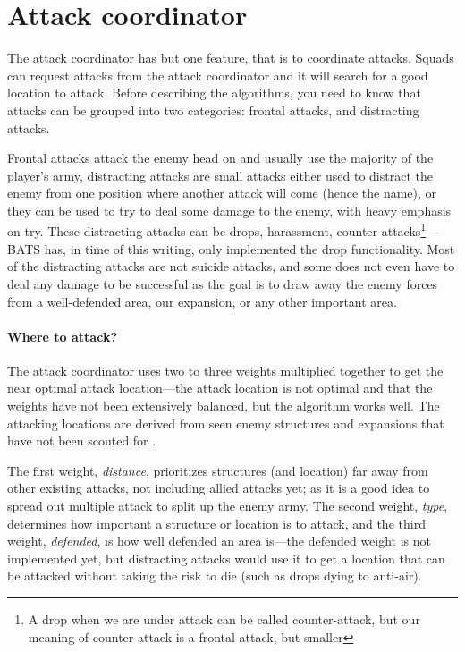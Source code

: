 
\section{Attack coordinator}
\label{sec:attack_coordinator}
The attack coordinator has but one feature, that is to coordinate attacks. Squads can request attacks from the attack coordinator and it will search for a good location to attack. Before describing the algorithms, you need to know that attacks can be grouped into two categories: frontal attacks, and distracting attacks.

Frontal attacks attack the enemy head on and usually use the majority of the player’s army, distracting attacks are small attacks either used to distract the enemy from one position where another attack will come (hence the name), or they can be used to try to deal some damage to the enemy, with heavy emphasis on try. These distracting attacks can be drops, harassment, counter-attacks\footnote{A drop when we are under attack can be called counter-attack, but our meaning of counter-attack is a frontal attack, but smaller}—BATS has, in time of this writing, only implemented the drop functionality. Most of the distracting attacks are not suicide attacks, and some does not even have to deal any damage to be successful as the goal is to draw away the enemy forces from a well-defended area, our expansion, or any other important area.

\paragraph{Where to attack?}
The attack coordinator uses two to three weights multiplied together to get the near optimal attack location—the attack location is not optimal and that the weights have not been extensively balanced, but the algorithm works well. The attacking locations are derived from seen enemy structures and expansions that have not been scouted for \attackCoordinatorExpansionNotCheckedTime.

The first weight, \emph{distance}, prioritizes structures (and location) far away from other existing attacks, not including allied attacks yet; as it is a good idea to spread out multiple attack to split up the enemy army. The second weight, \emph{type}, determines how important a structure or location is to attack, and the third weight, \emph{defended}, is how well defended an area is—the defended weight is not implemented yet, but distracting attacks would use it to get a location that can be attacked without taking the risk to die (such as drops dying to anti-air).

